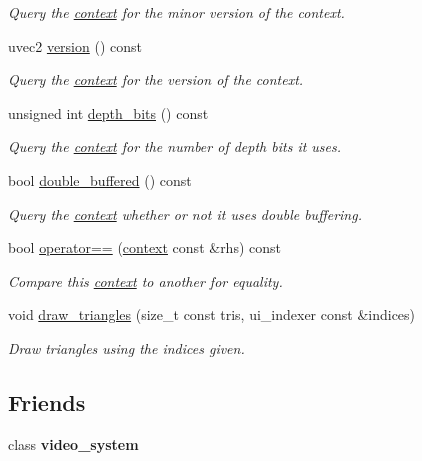 \begin{DoxyCompactItemize}
\begin{DoxyCompactList}\small\item\em Query the \hyperlink{classgfx_1_1context}{context} for the minor version of the context. \end{DoxyCompactList}\item 
uvec2 \hyperlink{classgfx_1_1context_ab8ca4b7f55d6a658f08db1078781e4ba}{version} () const 
\begin{DoxyCompactList}\small\item\em Query the \hyperlink{classgfx_1_1context}{context} for the version of the context. \end{DoxyCompactList}\item 
unsigned int \hyperlink{classgfx_1_1context_ac56da3c0c0c6ebf4bd12462a21ed62c4}{depth\-\_\-bits} () const 
\begin{DoxyCompactList}\small\item\em Query the \hyperlink{classgfx_1_1context}{context} for the number of depth bits it uses. \end{DoxyCompactList}\item 
bool \hyperlink{classgfx_1_1context_ab74649cd35aee6e49a03ec6e31f97ee2}{double\-\_\-buffered} () const 
\begin{DoxyCompactList}\small\item\em Query the \hyperlink{classgfx_1_1context}{context} whether or not it uses double buffering. \end{DoxyCompactList}\item 
bool \hyperlink{classgfx_1_1context_a3004cb783117e15e03e477ab7660657a}{operator==} (\hyperlink{classgfx_1_1context}{context} const \&rhs) const 
\begin{DoxyCompactList}\small\item\em Compare this \hyperlink{classgfx_1_1context}{context} to another for equality. \end{DoxyCompactList}\item 
void \hyperlink{classgfx_1_1context_aaef26684c1625beaea62af3f1b6aefd2}{draw\-\_\-triangles} (size\-\_\-t const tris, ui\-\_\-indexer const \&indices)
\begin{DoxyCompactList}\small\item\em Draw triangles using the indices given. \end{DoxyCompactList}\end{DoxyCompactItemize}
\subsection*{Friends}
\begin{DoxyCompactItemize}
\item 
\hypertarget{classgfx_1_1context_abfd69a86b028655cf7807981b1c58526}{class {\bfseries video\-\_\-system}}\label{classgfx_1_1context_abfd69a86b028655cf7807981b1c58526}

\end{DoxyCompactItemize}


